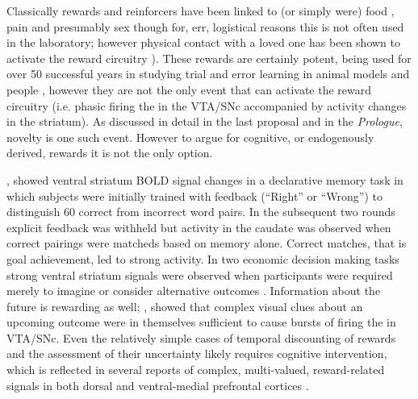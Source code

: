 \documentclass[doc,12pt]{apa}        %
\begin{document}
Classically rewards and reinforcers have been linked to (or simply were) food \cite{ODoherty:2006p2875}, pain \cite{Becerra:2011p7581,schultz:2007aa} and presumably sex though for, err, logistical reasons this is not often used in the laboratory; however physical contact with a loved one has been shown to activate the reward circuitry \cite{Izuma:2008p2822,Fliessbach:2007gf}).  These rewards are certainly potent, being used for over 50 successful years in studying trial and error learning in animal models \cite{iversen:2007aa} and people \cite{Kim:2010p7248,Montague:2006mz}, however they are not the only event that can activate the reward circuitry (i.e. phasic firing the in the VTA/SNc accompanied by activity changes in the striatum).  As discussed in detail in the last proposal and in the \emph{Prologue}, novelty is one such event.  However to argue for cognitive, or endogenously derived, rewards it is not the only option.  

, showed ventral striatum BOLD signal changes in a declarative memory task in which subjects were initially trained with feedback (``Right'' or ``Wrong'') to distinguish 60 correct from incorrect word pairs.  In the subsequent two rounds explicit feedback was withheld but activity in the caudate was observed when correct pairings were matcheds based on memory alone.  Correct matches, that is goal achievement, led to strong activity.  In two economic decision making tasks strong ventral striatum signals were observed when participants were required merely to imagine or consider alternative outcomes  \cite{Hayden:2009p6545,Lohrenz:2007p7240}.  Information about the future is rewarding as well; , showed that complex visual clues about an upcoming outcome were in themselves sufficient to cause bursts of firing the in VTA/SNc.  Even the relatively simple cases of temporal discounting of rewards and the assessment of their uncertainty likely requires cognitive intervention, which is reflected in several reports of complex, multi-valued, reward-related signals in both dorsal and ventral-medial prefrontal cortices \cite{Tobler:2009p8302,Wallis:2010p8303,Kim:2009p8304,Seymour:2008p6518}.
\end{document}
